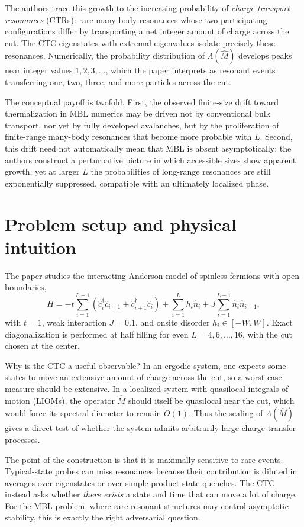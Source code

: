 \documentclass[11pt]{article}
\begin{document}
The authors trace this growth to the increasing probability of \emph{charge transport resonances} (CTRs): rare many-body resonances whose two participating configurations differ by transporting a net integer amount of charge across the cut. The CTC eigenstates with extremal eigenvalues isolate precisely these resonances. Numerically, the probability distribution of $\Lambda(\hat M)$ develops peaks near integer values $1,2,3,\dots$, which the paper interprets as resonant events transferring one, two, three, and more particles across the cut.

The conceptual payoff is twofold. First, the observed finite-size drift toward thermalization in MBL numerics may be driven not by conventional bulk transport, nor yet by fully developed avalanches, but by the proliferation of finite-range many-body resonances that become more probable with $L$. Second, this drift need not automatically mean that MBL is absent asymptotically: the authors construct a perturbative picture in which accessible sizes show apparent growth, yet at larger $L$ the probabilities of long-range resonances are still exponentially suppressed, compatible with an ultimately localized phase.

\section*{Problem setup and physical intuition}
The paper studies the interacting Anderson model of spinless fermions with open boundaries,
\[
\hat H=-t\sum_{i=1}^{L-1}(\hat c_i^\dagger \hat c_{i+1}+\hat c_{i+1}^\dagger \hat c_i)
+\sum_{i=1}^L h_i \hat n_i
+J\sum_{i=1}^{L-1} \hat n_i \hat n_{i+1},
\]
with $t=1$, weak interaction $J=0.1$, and onsite disorder $h_i\in[-W,W]$. Exact diagonalization is performed at half filling for even $L=4,6,\dots,16$, with the cut chosen at the center.

Why is the CTC a useful observable? In an ergodic system, one expects some states to move an extensive amount of charge across the cut, so a worst-case measure should be extensive. In a localized system with quasilocal integrals of motion (LIOMs), the operator $\hat M$ should itself be quasilocal near the cut, which would force its spectral diameter to remain $O(1)$. Thus the scaling of $\Lambda(\hat M)$ gives a direct test of whether the system admits arbitrarily large charge-transfer processes.

The point of the construction is that it is maximally sensitive to rare events. Typical-state probes can miss resonances because their contribution is diluted in averages over eigenstates or over simple product-state quenches. The CTC instead asks whether \emph{there exists} a state and time that can move a lot of charge. For the MBL problem, where rare resonant structures may control asymptotic stability, this is exactly the right adversarial question.
\end{document}
